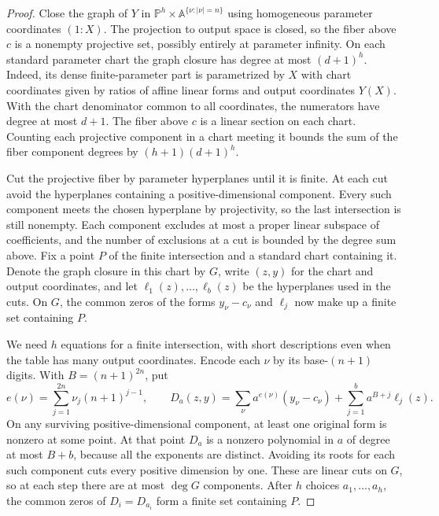 \begin{proof}
Close the graph of $Y$ in $\mathbb P^h\times\mathbb A^{\{\nu:|\nu|=n\}}$
using homogeneous parameter coordinates $(1:X)$. The projection to output
space is closed, so the fiber above $c$ is a nonempty projective set,
possibly entirely at parameter infinity. On each standard parameter
chart the graph closure has degree at most $(d+1)^h$. Indeed, its dense
finite-parameter part is parametrized by $X$ with chart coordinates
given by ratios of affine linear forms and output coordinates $Y(X)$.
With the chart denominator common to all coordinates, the numerators
have degree at most $d+1$. The fiber above $c$ is a linear section on
each chart. Counting each projective component in a chart meeting it
bounds the sum of the fiber component degrees by $(h+1)(d+1)^h$.

Cut the projective fiber by parameter hyperplanes until it is finite.
At each cut avoid the hyperplanes containing a positive-dimensional
component. Every such component meets the chosen hyperplane by
projectivity, so the last intersection is still nonempty. Each component
excludes at most a proper linear subspace of coefficients, and the
number of exclusions at a cut is bounded by the degree sum above.
Fix a point $P$ of the finite intersection and a standard chart containing
it. Denote the graph closure in this chart by $G$, write $(z,y)$ for the
chart and output coordinates, and let $\ell_1(z),\ldots,\ell_b(z)$ be
the hyperplanes used in the cuts. On $G$, the common zeros of the forms
$y_\nu-c_\nu$ and $\ell_j$ now make up a finite set containing $P$.

We need $h$ equations for a finite intersection, with short descriptions
even when the table has many output coordinates. Encode each $\nu$ by
its base-$(n+1)$ digits. With $B=(n+1)^{2n}$, put
\[
 e(\nu)=\sum_{j=1}^{2n}\nu_j(n+1)^{j-1},\qquad
 D_a(z,y)=\sum_\nu a^{e(\nu)}(y_\nu-c_\nu)
             +\sum_{j=1}^b a^{B+j}\ell_j(z).
\]
On any surviving positive-dimensional component, at least one original
form is nonzero at some point. At that point $D_a$ is a nonzero
polynomial in $a$ of degree at most $B+b$, because all the exponents
are distinct. Avoiding its roots for each such component cuts every
positive dimension by one. These are linear cuts on $G$, so at each
step there are at most $\deg G$ components. After $h$ choices
$a_1,\ldots,a_h$, the common zeros of $D_i=D_{a_i}$ form a finite
set containing $P$.


\end{proof}
